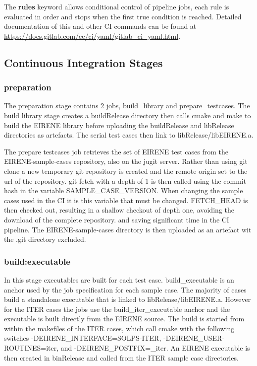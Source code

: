 The \textbf{rules} keyword allows conditional control of pipeline jobs, each rule is evaluated in order and stops when the first true condition is reached. Detailed documentation of this and other CI commands can be found at \url{https://docs.gitlab.com/ee/ci/yaml/gitlab_ci_yaml.html}.

\subsection{Continuous Integration Stages}

\subsubsection{preparation}
The preparation stage contains 2 jobs, {build\_library} and {prepare\_testcases}. The build library stage creates a {buildRelease} directory then calls cmake and make to build the EIRENE library before uploading the {buildRelease} and {libRelease} directories as artefacts. The serial test cases then link to {libRelease/libEIRENE.a}.

The prepare testcases job retrieves the set of EIRENE test cases from the {EIRENE-sample-cases} repository, also on the jugit server. Rather than using git clone a new temporary git repository is created and the remote origin set to the url of the repository. {git fetch} with a depth of 1 is then called using the commit hash in the variable {SAMPLE\_CASE\_VERSION}. When changing the sample cases used in the CI it is this variable that must be changed. {FETCH\_HEAD} is then checked out, resulting in a shallow checkout of depth one, avoiding the download of the complete repository. and saving significant time in the CI pipeline. The {EIRENE-sample-cases} directory is then uploaded as an artefact wit the {.git} directory excluded.

\subsubsection{build:executable}
In this stage executables are built for each test case. {build\_executable} is an anchor used by the job specification for each sample case. The majority of cases build a standalone executable that is linked to {libRelease/libEIRENE.a}. However for the ITER cases the jobs use the {build\_iter\_executable} anchor and the executable is built directly from the EIRENE source. The build is started from within the makefiles of the ITER cases, which call cmake with the following switches  {-DEIRENE\_INTERFACE=SOLPS-ITER}, {-DEIRENE\_USER-ROUTINES=iter}, and {-DEIRENE\_POSTFIX=\_iter}. An EIRENE executable is then created in binRelease and called from the ITER sample case directories.

